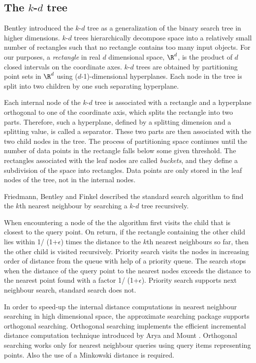 \subsection{The $k$-$d$ tree}
\label{KDT_section}

Bentley \cite{b-mbstu-75} introduced the $k$-$d$ tree as a generalization of the binary
search tree in higher dimensions. $k$-$d$ trees hierarchically decompose space into a
relatively small number of rectangles such that no rectangle contains too many input objects.
For our purposes, a {\it rectangle} in real $d$ dimensional space, $\R^d$, is the product of $d$ closed
intervals on the coordinate axes.
$k$-$d$ trees are obtained by partitioning point sets in $\R^d$ using
($d$-1)-dimensional hyperplanes.
Each node in the tree is split into two children by one such separating hyperplane.

Each internal node of the $k$-$d$ tree is associated with a rectangle
and a hyperplane orthogonal to
one of the coordinate axis, which splits the rectangle into two parts.
Therefore, such a hyperplane, defined by a splitting dimension
and a splitting value, is called a separator.
These two parts are then associated
with the two child nodes in the tree. The process of partitioning space continues until the number of data
points in the rectangle falls below some given threshold. The rectangles associated with the leaf nodes
are called {\it buckets}, and they define a subdivision of the space into rectangles.
Data points are only stored in the leaf nodes of the tree, not in the internal nodes.

Friedmann, Bentley and Finkel \cite{fbf-afbml-77} described the standard
search algorithm to find the $k$th nearest neighbour by searching a $k$-$d$ tree recursively.

When encountering a node of the  the algorithm first visits the child that is closest
to the query point. On return, if the rectangle containing  the other child lies within
1/ (1+$\epsilon$) times the distance to the $k$th nearest neighbours so far, then
the other child is visited recursively.
Priority search \cite{am-annqf-93} visits the nodes in increasing order of distance from
the queue with help of a priority queue.
The search stops when the distance of the query point to the nearest nodes
exceeds the distance to the nearest point found with a factor 1/ (1+$\epsilon$).
Priority search supports next neighbour search, standard search does not.

In order to speed-up the internal distance computations in nearest neighbour searching
in high dimensional space, the approximate searching package supports orthogonal searching. Orthogonal
searching implements the efficient incremental distance computation
technique introduced by Arya and Mount \cite{am-afvq-93}.
Orthogonal searching works only for nearest neighbour queries using query items representing
points. Also the use of a Minkowski distance is required.

